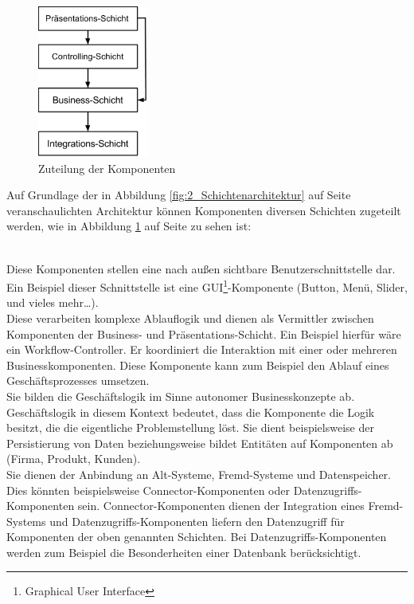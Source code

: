 \begin{figure}[h]
\centering
\includegraphics[height=5.0cm]{images/Schichtenarchitektur.png}
\caption[
Zuteilung der Komponenten
]{Zuteilung der Komponenten}
\label{fig:2_Schichtenarchitektur2}
\end{figure}

Auf Grundlage der in Abbildung \ref{fig:2_Schichtenarchitektur} auf Seite \pageref{fig:2_Schichtenarchitektur} veranschaulichten Architektur können Komponenten diversen Schichten zugeteilt werden, wie in Abbildung \ref{fig:2_Schichtenarchitektur2} auf Seite \pageref{fig:2_Schichtenarchitektur2} zu sehen ist:
\begin{enumerate}
 \hfill \\
Diese Komponenten stellen eine nach außen sichtbare Benutzerschnittstelle dar. Ein Beispiel dieser Schnittstelle ist eine GUI\footnote{Graphical User Interface}-Komponente (Button, Menü, Slider, und vieles mehr\dots).
 \hfill \\
Diese verarbeiten komplexe Ablauflogik und dienen als Vermittler zwischen Komponenten der Business- und Präsentations-Schicht. Ein Beispiel hierfür wäre ein Workflow-Controller. Er koordiniert die Interaktion mit einer oder mehreren Businesskomponenten. Diese Komponente kann zum Beispiel den Ablauf eines Geschäftsprozesses umsetzen.
 \hfill \\
Sie bilden die Geschäftslogik im Sinne autonomer Businesskonzepte ab. Geschäftslogik in diesem Kontext bedeutet, dass die Komponente die Logik besitzt, die die eigentliche Problemstellung löst. Sie dient beispielsweise der Persistierung von Daten beziehungsweise bildet Entitäten auf Komponenten ab (Firma, Produkt, Kunden).
 \hfill \\
Sie dienen der Anbindung an Alt-Systeme, Fremd-Systeme und Datenspeicher. Dies könnten beispielsweise Connector-Komponenten oder Datenzugriffs-Komponenten sein. Connector-Komponenten dienen der Integration eines Fremd-Systems und Datenzugriffs-Komponenten liefern den Datenzugriff für Komponenten der oben genannten Schichten. Bei Datenzugriffs-Komponenten werden zum Beispiel die Besonderheiten einer Datenbank berücksichtigt.
\end{enumerate}

